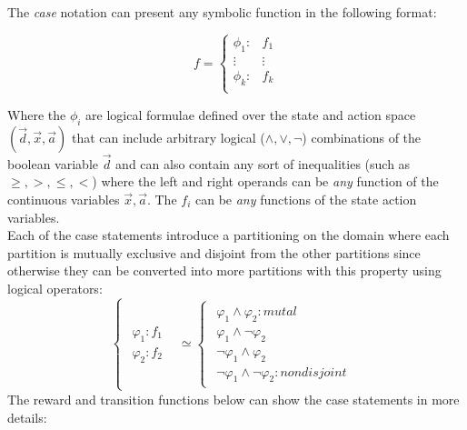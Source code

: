 \documentclass[letterpaper]{article}
\renewcommand{\-}{\text{-}}
\begin{document}
The \textit{case} notation can present any symbolic function in the following format: 

\begin{equation}
f = 
\begin{cases}
  \phi_1: & f_1 \\ 
 \vdots&\vdots\\ 
  \phi_k: & f_k \\ 
\end{cases}
\end{equation}

Where the $\phi_i$ are logical formulae defined over the state and action space $(\vec{d},\vec{x},\vec{a})$ that can include arbitrary logical ($\land,\lor,\neg$) combinations of the boolean variable $\vec{d}$ and can also contain any sort of
inequalities (such as $\geq,>,\leq,<$) where the left and right operands can be \emph{any} function of the continuous variables $\vec{x},\vec{a}$. 
The $f_i$ can be \emph{any} functions of the state action variables.  
\\
Each of the case statements introduce a partitioning on the domain where each partition is mutually exclusive and disjoint from the other partitions since otherwise they can be converted into more partitions with this property using logical operators: 
{%
\[
\begin{cases}
\begin{array}{c}
\varphi_{1}:f_{1}\\
\varphi_{2}:f_{2}
\end{array} & \simeq\begin{cases}
\begin{array}{c}
\varphi_{1}\wedge\varphi_{2}:mutal\\
\varphi_{1}\wedge\neg\varphi_{2}\\
\neg\varphi_{1}\wedge\varphi_{2}\\
\neg\varphi_{1}\wedge\neg\varphi_{2}:nondisjoint
\end{array}\end{cases}\end{cases}
\]
}
The reward and transition functions below can show the case statements in more details:
\end{document}
